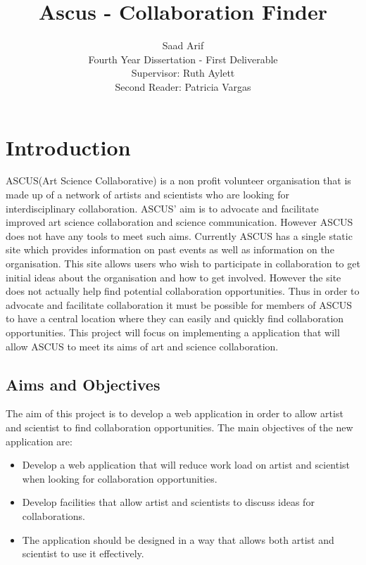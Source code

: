 \documentclass[a4paper,oneside,11pt]{report}
\begin{document}
\title{Ascus - Collaboration Finder}
\author{Saad Arif\\Fourth Year Dissertation - First Deliverable \\ Supervisor: Ruth Aylett \\ Second Reader: Patricia Vargas}
\maketitle
\pagestyle{empty} %
\tableofcontents %
\listoffigures
{}
\pagestyle{plain} %
\listoftables
{}
\cleardoublepage %
\pagestyle{plain} %
\setcounter{page}{1} %

\chapter{Introduction}
ASCUS(Art Science Collaborative) is a non profit volunteer organisation that is made up of a network of artists and scientists who are looking for interdisciplinary collaboration. ASCUS' aim is to advocate and facilitate improved art science collaboration and science communication\autocite{ascus}. However ASCUS does not have any tools  to meet such aims. Currently ASCUS has a single static site which provides information on past events as well as information on the organisation. This site allows users who wish to participate in collaboration to get initial ideas about the organisation and how to get involved. However the site does not actually help find potential collaboration opportunities. Thus in order to advocate and facilitate collaboration it must be possible for members of ASCUS to have a central location where they can easily and quickly find collaboration opportunities. This project will focus on implementing a application that will allow ASCUS to meet its aims of art and science collaboration.
\section{Aims and Objectives}
The aim of this project is to develop a web application in order to allow artist and scientist to find collaboration opportunities.
The main objectives of the new application are:
\begin{itemize}
	\item Develop a web application that will reduce work load on artist and scientist when looking for collaboration opportunities.
	\item Develop facilities that allow artist and scientists to discuss ideas for collaborations.
	\item The application should be designed in a way that allows both artist and scientist to use it effectively.
\end{itemize}
	
\end{document}
